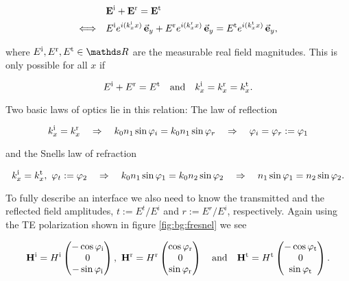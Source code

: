 \begin{equation}
\begin{aligned}
    &\vb E^{\mathrm{i}} + \vb E^{\mathrm{r}} = \vb E^{\mathrm{t}} \\
    \Longleftrightarrow \quad
    &E^{\mathrm{i}} e^{i(k^{\mathrm{i}}_x x)} \, \va e_y +
    E^{\mathrm{r}} e^{i(k^{\mathrm{r}}_x x)} \, \va e_y = 
    E^{\mathrm{t}} e^{i(k^{\mathrm{t}}_x x)} \, \va e_y,
\end{aligned}
\end{equation}

where $E^\s i, E^\s r, E^\s t \in \mathds R$ are the measurable real field magnitudes. This is only possible for all $x$ if

\begin{equation} \label{eq:bg:x}
    E^\s{i} + E^\s{r} = E^\s{t} \qq{and}
    k^\s{i}_x = k^\s{r}_x = k^\s{t}_x.
\end{equation}

Two basic laws of optics lie in this relation: The law of reflection

\begin{equation}
    k^{\mathrm{i}}_x = k^{\mathrm{r}}_x
    \quad \Rightarrow \quad
    k_0 n_1 \sin \varphi_i =  k_0 n_1 \sin \varphi_r
    \quad \Rightarrow \quad
    \varphi_i = \varphi_r := \varphi_1
\end{equation}

and the Snells law of refraction

\begin{equation}
    k^{\mathrm{i}}_x = k^{\mathrm{t}}_x, \
    \varphi_t := \varphi_2
    \quad \Rightarrow \quad
    k_0 n_1 \sin \varphi_1 =  k_0 n_2 \sin \varphi_2
    \quad \Rightarrow \quad
    n_1 \sin \varphi_1 = n_2 \sin \varphi_2.
\end{equation}

To fully describe an interface we also need to know the transmitted and the reflected field amplitudes,  
$t := E^t / E^i$ 
and 
$r := E^r / E^i$, 
respectively.
Again using the TE polarization shown in figure \ref{fig:bg:fresnel} we see

\begin{equation} \label{eq:bg:H}
    \vb H^\s{i} = H^\s{i}
    \begin{pmatrix}
        -\cos \varphi_\s{i}\\ 0\\ -\sin \varphi_\s{i}
    \end{pmatrix}
    , \
    \vb H^\s{r} = H^\s{r}
    \begin{pmatrix}
        \cos \varphi_\s{r} \\ 0\\ \sin \varphi_\s{r}
    \end{pmatrix}
    \qq{and}
    \vb H^\s{t} = H^\s{t}
    \begin{pmatrix}
        -\cos \varphi_\s{t}\\ 0\\ \sin \varphi_\s{t}
    \end{pmatrix}.
\end{equation}

